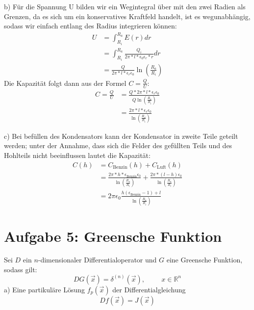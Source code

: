\documentclass[11pt a4paper]{article}
\newcommand{\epsz}{\epsilon_0}
\begin{document}
\vspace{0.5cm}
\par{b)}
Für die Spannung U bilden wir ein Wegintegral über mit den zwei Radien als 
Grenzen, da es sich um ein konservatives Kraftfeld handelt, ist es 
wegunabhängig, sodass wir einfach entlang des Radius integrieren können:
\begin{align*}
	U &= \int_{R_i}^{R_a} E(r) dr \\
	&= \int_{R_i}^{R_a} \frac{Q_i}{2\pi * l * \epsz \epsilon_r* r} dr \\
	&= \frac{Q}{2\pi * l * \epsilon_r \epsz} \ln\left(\frac{R_a}{R_i}
	\right)
\end{align*}
Die Kapazität folgt dann aus der Formel $C = \frac QU$:
\begin{align*}
	C = \frac QU &= \frac{Q * 2\pi * l * \epsilon_r \epsz}
	{Q \ln\left(\frac{R_a}{R_i}\right)} \\
	&= \frac{2\pi * l * \epsilon_r \epsz}
	{\ln\left(\frac{R_a}{R_i}\right)} 
\end{align*}

\par{c)}
Bei befüllen des Kondensators kann der Kondensator in zweite Teile geteilt
werden; unter der Annahme, dass sich die Felder des gefüllten Teils und des
Hohlteils nicht beeinflussen lautet die Kapazität:
\begin{align*}
	C(h) &= C_\text{Benzin}(h) + C_\text{Luft}(h) \\
	&= \frac{2\pi * h * \epsilon_\text{Benzin} \epsz}
	{\ln\left(\frac{R_a}{R_i}\right)} +
	\frac{2\pi * (l-h)  \epsz}
	{\ln\left(\frac{R_a}{R_i}\right)} \\
	&= 2\pi\epsz \frac{h (\epsilon_\text{Benzin} -1 )+ l}
	{\ln\left(\frac{R_a}{R_i}\right)}
\end{align*}

\newpage

\section*{Aufgabe 5: Greensche Funktion}
Sei $D$ ein $n$-dimensionaler Differentialoperator und $G$ eine Greensche Funktion, sodass 
gilt:
\[
	DG(\vec x) = \delta^{(n)}(\vec x), \hspace{1cm} x \in \mathbb{R}^n
\]
a) Eine partikuläre Lösung $f_p(\vec x)$ der Differentialgleichung
\[
	Df(\vec x) = J(\vec x)
\]
\end{document}
